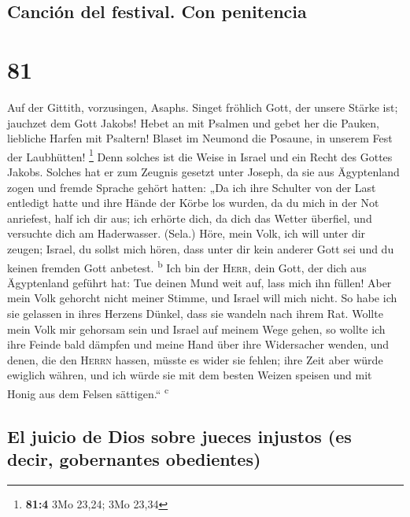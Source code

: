 \hypertarget{canciuxf3n-del-festival.-con-penitencia}{%
\subsection{Canción del festival. Con
penitencia}\label{canciuxf3n-del-festival.-con-penitencia}}

\hypertarget{section-80}{%
\section{81}\label{section-80}}

 Auf der Gittith, vorzusingen, Asaphs. 
Singet fröhlich Gott, der unsere Stärke ist; jauchzet dem Gott Jakobs!
 Hebet an mit Psalmen und gebet her die Pauken, liebliche
Harfen mit Psaltern!  Blaset im Neumond die Posaune, in
unserem Fest der Laubhütten! \footnote{\textbf{81:4} 3Mo 23,24; 3Mo
  23,34}  Denn solches ist die Weise in Israel und ein
Recht des Gottes Jakobs.  Solches hat er zum Zeugnis
gesetzt unter Joseph, da sie aus Ägyptenland zogen und fremde Sprache
gehört hatten:  „Da ich ihre Schulter von der Last
entledigt hatte und ihre Hände der Körbe los wurden,  da
du mich in der Not anriefest, half ich dir aus; ich erhörte dich, da
dich das Wetter überfiel, und versuchte dich am Haderwasser. (Sela.)
 Höre, mein Volk, ich will unter dir zeugen; Israel, du
sollst mich hören,  dass unter dir kein anderer Gott sei
und du keinen fremden Gott anbetest. \textsuperscript{b} 
Ich bin der \textsc{Herr}, dein Gott, der dich aus Ägyptenland geführt
hat: Tue deinen Mund weit auf, lass mich ihn füllen! 
Aber mein Volk gehorcht nicht meiner Stimme, und Israel will mich nicht.
 So habe ich sie gelassen in ihres Herzens Dünkel, dass
sie wandeln nach ihrem Rat.  Wollte mein Volk mir
gehorsam sein und Israel auf meinem Wege gehen,  so
wollte ich ihre Feinde bald dämpfen und meine Hand über ihre Widersacher
wenden,  und denen, die den \textsc{Herrn} hassen, müsste
es wider sie fehlen; ihre Zeit aber würde ewiglich währen,
 und ich würde sie mit dem besten Weizen speisen und mit
Honig aus dem Felsen sättigen.`` \textsuperscript{c}

\hypertarget{el-juicio-de-dios-sobre-jueces-injustos-es-decir-gobernantes-obedientes}{%
\subsection{El juicio de Dios sobre jueces injustos (es decir,
gobernantes
obedientes)}\label{el-juicio-de-dios-sobre-jueces-injustos-es-decir-gobernantes-obedientes}}

